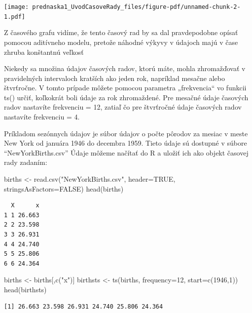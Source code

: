 \documentclass[
  letterpaper,
  DIV=11,
  numbers=noendperiod]{scrreprt}
\newenvironment{Shaded}{\begin{snugshade}}{\end{snugshade}}
\newcommand{\AttributeTok}[1]{\textcolor[rgb]{0.40,0.45,0.13}{#1}}
\newcommand{\ConstantTok}[1]{\textcolor[rgb]{0.56,0.35,0.01}{#1}}
\newcommand{\DecValTok}[1]{\textcolor[rgb]{0.68,0.00,0.00}{#1}}
\newcommand{\FunctionTok}[1]{\textcolor[rgb]{0.28,0.35,0.67}{#1}}
\newcommand{\NormalTok}[1]{\textcolor[rgb]{0.00,0.23,0.31}{#1}}
\newcommand{\OtherTok}[1]{\textcolor[rgb]{0.00,0.23,0.31}{#1}}
\newcommand{\StringTok}[1]{\textcolor[rgb]{0.13,0.47,0.30}{#1}}
\begin{document}
\texttt{[image: prednaska1\_UvodCasoveRady\_files/figure-pdf/unnamed-chunk-2-1.pdf]}

Z časového grafu vidíme, že tento časový rad by sa dal pravdepodobne
opísať pomocou aditívneho modelu, pretože náhodné výkyvy v údajoch majú
v čase zhruba konštantnú veľkosť

Niekedy sa množina údajov časových radov, ktorú máte, mohla zhromažďovať
v pravidelných intervaloch kratších ako jeden rok, napríklad mesačne
alebo štvrťročne. V tomto prípade môžete pomocou parametra „frekvencia``
vo funkcii ts() určiť, koľkokrát boli údaje za rok zhromaždené. Pre
mesačné údaje časových radov nastavíte frekvenciu = 12, zatiaľ čo pre
štvrťročné údaje časových radov nastavíte frekvenciu = 4.

Príkladom sezónnych údajov je súbor údajov o počte pôrodov za mesiac v
meste New York od januára 1946 do decembra 1959. Tieto údaje sú dostupné
v súbore ``NewYorkBirths.csv'' Údaje môžeme načítať do R a uložiť ich
ako objekt časovej rady zadaním:

\begin{Shaded}
\begin{Highlighting}[]
\NormalTok{births }\OtherTok{\textless{}{-}} \FunctionTok{read.csv}\NormalTok{(}\StringTok{"NewYorkBirths.csv"}\NormalTok{, }\AttributeTok{header=}\ConstantTok{TRUE}\NormalTok{, }\AttributeTok{stringsAsFactors=}\ConstantTok{FALSE}\NormalTok{)}
\FunctionTok{head}\NormalTok{(births)}
\end{Highlighting}
\end{Shaded}

\begin{verbatim}
  X      x
1 1 26.663
2 2 23.598
3 3 26.931
4 4 24.740
5 5 25.806
6 6 24.364
\end{verbatim}

\begin{Shaded}
\begin{Highlighting}[]
\NormalTok{births }\OtherTok{\textless{}{-}}\NormalTok{ births[,}\FunctionTok{c}\NormalTok{(}\StringTok{"x"}\NormalTok{)]}
\NormalTok{birthsts }\OtherTok{\textless{}{-}} \FunctionTok{ts}\NormalTok{(births, }\AttributeTok{frequency=}\DecValTok{12}\NormalTok{, }\AttributeTok{start=}\FunctionTok{c}\NormalTok{(}\DecValTok{1946}\NormalTok{,}\DecValTok{1}\NormalTok{))}
\FunctionTok{head}\NormalTok{(birthsts)}
\end{Highlighting}
\end{Shaded}

\begin{verbatim}
[1] 26.663 23.598 26.931 24.740 25.806 24.364
\end{verbatim}
\end{document}
